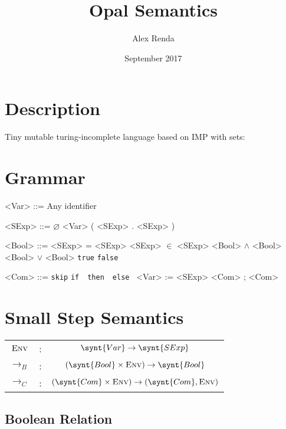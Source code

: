 \documentclass{article}
\title{Opal Semantics}
\author{Alex Renda}
\date{September 2017}
\newcommand{\ifstmt}[3]{\texttt{if}\ #1\ \texttt{then}\ #2\ \texttt{else}\ #3}
\newcommand{\true}{\texttt{true}}
\newcommand{\false}{\texttt{false}}
\newcommand{\skipcom}{\texttt{skip}}
\newcommand{\onestep}[1]{\rightarrow_{#1}}
\newcommand{\com}{C}
\newcommand{\bool}{B}
\begin{document}
\maketitle

\section{Description}

Tiny mutable turing-incomplete language based on IMP with sets:

\section{Grammar}

\begin{grammar}
<Var> ::= Any identifier

<SExp> ::= $\varnothing$
\alt <Var>
\alt ( <SExp> . <SExp> )

<Bool> ::= <SExp> = <SExp>
\alt <SExp> $\in$ <SExp>
\alt <Bool> $\land$ <Bool>
\alt <Bool> $\lor$ <Bool>
\alt \true
\alt \false

<Com> ::= \skipcom
\alt \ifstmt{}{}{}
\alt <Var> := <SExp>
\alt <Com> ; <Com>

\end{grammar}

\section{Small Step Semantics}
\begin{center}
\begin{tabular}{c c c}
$\textsc{Env}$  & :  & $\synt{Var} \rightarrow \synt{SExp}$ \\
$\onestep\bool$  & :  & $(\synt{Bool} \times \textsc{Env}) \rightarrow \synt{Bool}$ \\
$\onestep\com$  & :  & $(\synt{Com} \times \textsc{Env}) \rightarrow (\synt{Com}, \textsc{Env})$ \\
\end{tabular}
\end{center}

\subsection{Boolean Relation}

\end{document}
